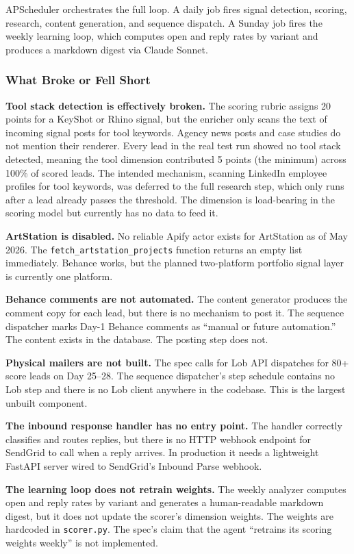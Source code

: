 \documentclass[11pt, letterpaper]{article}
\begin{document}
APScheduler orchestrates the full loop. A daily job fires signal detection,
scoring, research, content generation, and sequence dispatch. A Sunday job fires
the weekly learning loop, which computes open and reply rates by variant and
produces a markdown digest via Claude Sonnet.

\subsubsection{What Broke or Fell Short}

\textbf{Tool stack detection is effectively broken.} The scoring rubric assigns
20 points for a KeyShot or Rhino signal, but the enricher only scans the text
of incoming signal posts for tool keywords. Agency news posts and case studies
do not mention their renderer. Every lead in the real test run showed no tool
stack detected, meaning the tool dimension contributed 5 points (the minimum)
across 100\% of scored leads. The intended mechanism, scanning LinkedIn
employee profiles for tool keywords, was deferred to the full research step,
which only runs after a lead already passes the threshold. The dimension is
load-bearing in the scoring model but currently has no data to feed it.

\textbf{ArtStation is disabled.} No reliable Apify actor exists for ArtStation
as of May 2026. The \texttt{fetch\_artstation\_projects} function returns an
empty list immediately. Behance works, but the planned two-platform portfolio
signal layer is currently one platform.

\textbf{Behance comments are not automated.} The content generator produces the
comment copy for each lead, but there is no mechanism to post it. The sequence
dispatcher marks Day-1 Behance comments as ``manual or future automation.'' The
content exists in the database. The posting step does not.

\textbf{Physical mailers are not built.} The spec calls for Lob API dispatches
for 80+ score leads on Day 25--28. The sequence dispatcher's step schedule
contains no Lob step and there is no Lob client anywhere in the codebase. This
is the largest unbuilt component.

\textbf{The inbound response handler has no entry point.} The handler correctly
classifies and routes replies, but there is no HTTP webhook endpoint for
SendGrid to call when a reply arrives. In production it needs a lightweight
FastAPI server wired to SendGrid's Inbound Parse webhook.

\textbf{The learning loop does not retrain weights.} The weekly analyzer
computes open and reply rates by variant and generates a human-readable markdown
digest, but it does not update the scorer's dimension weights. The weights are
hardcoded in \texttt{scorer.py}. The spec's claim that the agent ``retrains its
scoring weights weekly'' is not implemented.
\end{document}
